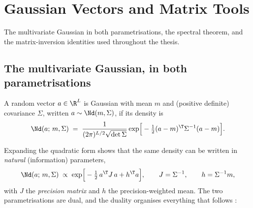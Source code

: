\chapter{Gaussian Vectors and Matrix Tools}
\label{app:linalg}

The multivariate Gaussian in both parametrisations, the spectral theorem,
and the matrix-inversion identities used throughout the thesis.

\section{The multivariate Gaussian, in both parametrisations}
\label{sec:gauss-vectors}

\begin{definition}\label{def:gaussian}
A random vector $a \in \R^L$ is Gaussian with mean $m$ and (positive
definite) covariance $\Sigma$, written $a \sim \Nd(m, \Sigma)$, if its
density is
\begin{equation}
  \Nd(a;\, m, \Sigma)
  \;=\; \frac{1}{(2\pi)^{L/2} \sqrt{\det \Sigma}}
  \exp\!\Big[ -\tfrac{1}{2} (a - m)^\T \Sigma^{-1} (a - m) \Big] .
  \label{eq:gauss-density}
\end{equation}
\end{definition}

Expanding the quadratic form shows that the same density can be written
in \emph{natural} (information) parameters,
\begin{equation}
  \Nd(a;\, m, \Sigma) \;\propto\;
  \exp\!\Big[ -\tfrac{1}{2}\, a^\T J\, a + h^\T a \Big],
  \qquad
  J = \Sigma^{-1},
  \qquad
  h = \Sigma^{-1} m ,
  \label{eq:gauss-natural}
\end{equation}
with $J$ the \emph{precision matrix} and $h$ the precision-weighted mean.
The two parametrisations are dual, and the duality organises everything
that follows \citep{bishop2006pattern, koller2009probabilistic}:

